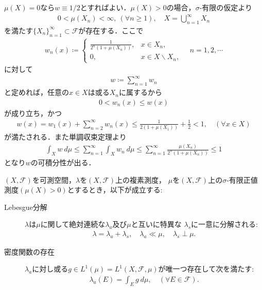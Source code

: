 	\begin{prf}
		$\mu(X) = 0$なら$w \equiv 1/2$とすればよい．$\mu(X) > 0$の場合，$\sigma$-有限の仮定より
		\begin{align}
			0 < \mu(X_n) < \infty,\ (\forall n \geq 1),
			\quad X = \bigcup_{n=1}^\infty X_n
		\end{align}
		を満たす$\{X_n\}_{n=1}^\infty \subset \mathscr{F}$が存在する．ここで
		\begin{align}
			w_n(x) \coloneqq
			\begin{cases}
				\displaystyle\frac{1}{2^n\left(1+\mu(X_n)\right)}, & x \in X_n, \\
				0, & x \in X \backslash X_n,
			\end{cases}
			\quad n=1,2,\cdots
		\end{align}
		に対して
		\begin{align}
			w \coloneqq \sum_{n=1}^\infty w_n
		\end{align}
		と定めれば，任意の$x \in X$は或る$X_n$に属するから
		\begin{align}
			0 < w_n(x) \leq w(x)
		\end{align}
		が成り立ち，かつ
		\begin{align}
			w(x) = w_1(x) + \sum_{n=2}^\infty w_n(x)
			\leq \frac{1}{2\left(1+\mu(X_1)\right)} + \frac{1}{2}
			< 1,
			\quad (\forall x \in X)
		\end{align}
		が満たされる．また単調収束定理より
		\begin{align}
			\int_X w\ d\mu \leq \sum_{n=1}^\infty \int_X w_n\ d\mu
			\leq \sum_{n=1}^\infty \frac{\mu(X_n)}{2^n\left(1+\mu(X_n)\right)}
			\leq 1
		\end{align}
		となり$w$の可積分性が出る．
		\QED
	\end{prf}
	
	\begin{screen}
		\begin{thm}
			$(X,\mathscr{F})$を可測空間，$\lambda$を$(X,\mathscr{F})$上の複素測度，
			$\mu$を$(X,\mathscr{F})$上の$\sigma$-有限正値測度$(\mu(X)>0)$とするとき，以下が成立する:
			\begin{description}
				\item[Lebesgue分解]
					$\lambda$は$\mu$に関して絶対連続な$\lambda_a$及び$\mu$と互いに特異な
					$\lambda_s$に一意に分解される:
					\begin{align}
						\lambda = \lambda_a + \lambda_s,
						\quad \lambda_a \ll \mu,
						\quad \lambda_s \perp \mu.
					\end{align}
				
				\item[密度関数の存在]
					$\lambda_a$に対し或る$g \in L^1(\mu) = L^1(X,\mathscr{F},\mu)$が唯一つ存在して次を満たす:
					\begin{align}
						\lambda_a(E) = \int_E g\ d\mu,
						\quad (\forall E \in \mathscr{F}).
					\end{align}
			\end{description}
		\end{thm}
	\end{screen}
	
